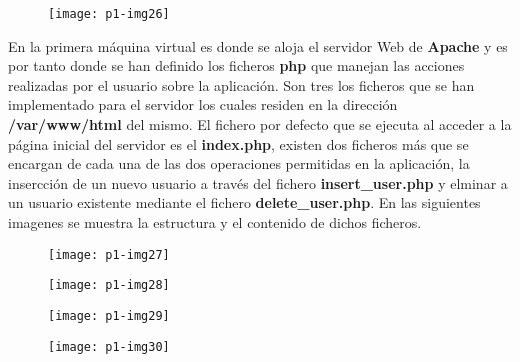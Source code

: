 \documentclass[10pt]{article}
\begin{document}
 \begin{figure}[H]
	\begin{center}
 		\texttt{[image: p1-img26]}
	\end{center} 
\end{figure}

En la primera máquina virtual es donde se aloja el servidor Web de \textbf{Apache} y es por tanto donde se han definido los ficheros \textbf{php} que manejan las acciones realizadas por el usuario sobre la aplicación. Son tres los ficheros que se han implementado para el servidor los cuales residen en la dirección \textbf{/var/www/html} del mismo. El fichero por defecto que se ejecuta al acceder a la página inicial del servidor es el \textbf{index.php}, existen dos ficheros más que se encargan de cada una de las dos operaciones permitidas en la aplicación, la insercción de un nuevo usuario a través del fichero \textbf{insert\_user.php} y elminar a un usuario existente mediante el fichero \textbf{delete\_user.php}. En las siguientes imagenes se muestra la estructura y el contenido de dichos ficheros.\\ 

 \begin{figure}[H]
	\begin{center}
 		\texttt{[image: p1-img27]}
	\end{center} 
\end{figure}

 \begin{figure}[H]
	\begin{center}
 		\texttt{[image: p1-img28]}
	\end{center} 
\end{figure}

 \begin{figure}[H]
	\begin{center}
 		\texttt{[image: p1-img29]}
	\end{center} 
\end{figure}

 \begin{figure}[H]
	\begin{center}
 		\texttt{[image: p1-img30]}
	\end{center} 
\end{figure}
\end{document}

